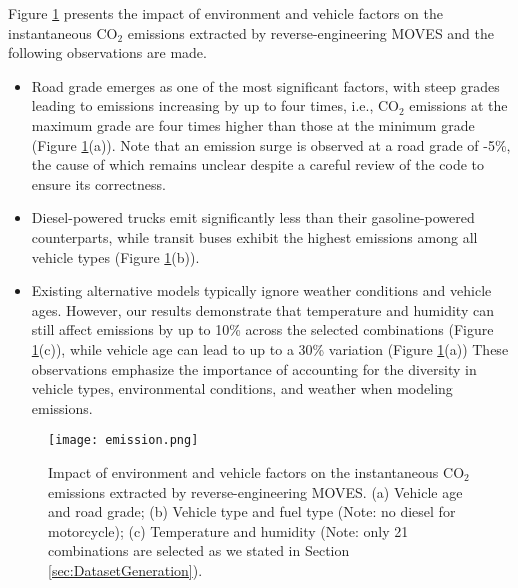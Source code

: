 \documentclass[12pt,english]{article}
\begin{document}
Figure \ref{fig:emission} presents the impact of environment and vehicle factors on the instantaneous CO$_2$ emissions extracted by reverse-engineering MOVES and the following observations are made.
\begin{itemize}
    \item Road grade emerges as one of the most significant factors, with steep grades leading to emissions increasing by up to four times, i.e., CO$_2$ emissions at the maximum grade are four times higher than those at the minimum grade (Figure \ref{fig:emission}(a)).
    Note that an emission surge is observed at a road grade of -5\%, the cause of which remains unclear despite a careful review of the code to ensure its correctness.
    
    \item Diesel-powered trucks emit significantly less than their gasoline-powered counterparts, while transit buses exhibit the highest emissions among all vehicle types (Figure \ref{fig:emission}(b)). 
    
    \item Existing alternative models typically ignore weather conditions and vehicle ages. However, our results demonstrate that temperature and humidity can still affect emissions by up to 10\% across the selected combinations (Figure \ref{fig:emission}(c)), while vehicle age can lead to up to a 30\% variation (Figure \ref{fig:emission}(a))
    These observations emphasize the importance of accounting for the diversity in vehicle types, environmental conditions, and weather when modeling emissions.
    
\end{itemize}





\begin{figure}
    \centering
    \texttt{[image: emission.png]}
    \caption{Impact of environment and vehicle factors on the instantaneous CO$_2$ emissions extracted by reverse-engineering MOVES.
    (a) Vehicle age and road grade;
    (b) Vehicle type and fuel type (Note: no diesel for motorcycle);
    (c) Temperature and humidity (Note: only 21 combinations are selected as we stated in Section \ref{sec:DatasetGeneration}).}
    \label{fig:emission}
\end{figure}
\end{document}
